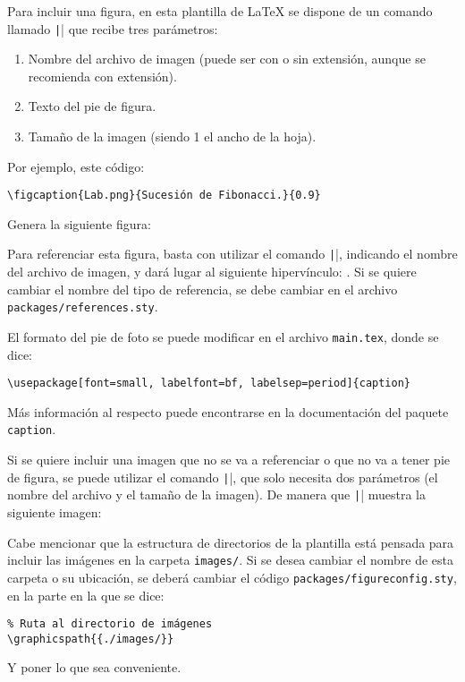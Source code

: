 \documentclass[../../main.tex]{subfile}
\begin{document}
  Para incluir una figura, en esta plantilla de LaTeX se dispone de un comando llamado \texttt|\figcaption| que recibe tres parámetros:

  \begin{enumerate}
    \item Nombre del archivo de imagen (puede ser con o sin extensión, aunque se recomienda con extensión).
    \item Texto del pie de figura.
    \item Tamaño de la imagen (siendo 1 el ancho de la hoja).
  \end{enumerate}

  Por ejemplo, este código:

  \begin{verbatim}
\figcaption{Lab.png}{Sucesión de Fibonacci.}{0.9}
  \end{verbatim}

  Genera la siguiente figura:


  Para referenciar esta figura, basta con utilizar el comando \texttt||, indicando el nombre del archivo de imagen, y dará lugar al siguiente hipervínculo: . Si se quiere cambiar el nombre del tipo de referencia, se debe cambiar en el archivo \texttt{packages/references.sty}.

  El formato del pie de foto se puede modificar en el archivo \texttt{main.tex}, donde se dice:

  \begin{verbatim}
\usepackage[font=small, labelfont=bf, labelsep=period]{caption}
  \end{verbatim}

  Más información al respecto puede encontrarse en la documentación del paquete \texttt{caption}.

  Si se quiere incluir una imagen que no se va a referenciar o que no va a tener pie de figura, se puede utilizar el comando \texttt|\fignocaption|, que solo necesita dos parámetros (el nombre del archivo y el tamaño de la imagen). De manera que \texttt|| muestra la siguiente imagen:


  Cabe mencionar que la estructura de directorios de la plantilla está pensada para incluir las imágenes en la carpeta \texttt{images/}. Si se desea cambiar el nombre de esta carpeta o su ubicación, se deberá cambiar el código \texttt{packages/figureconfig.sty}, en la parte en la que se dice:

  \begin{verbatim}
% Ruta al directorio de imágenes
\graphicspath{{./images/}}
  \end{verbatim}

  Y poner lo que sea conveniente.
\end{document}
